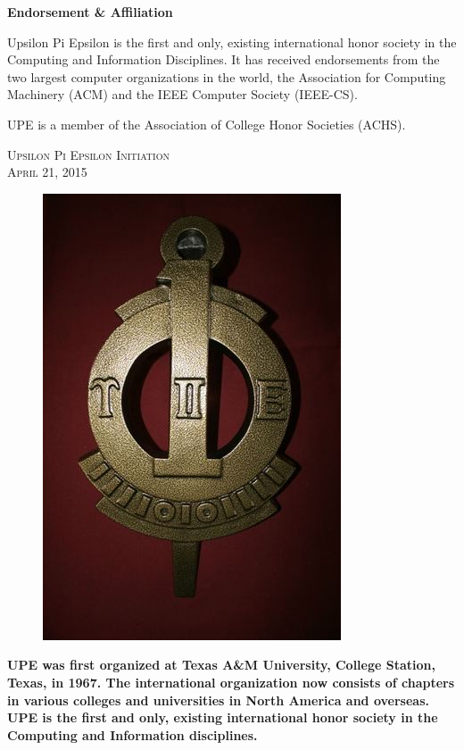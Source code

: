 \documentclass{article}
\begin{document}
\begin{multicols}{2}
{\begin{center}\textbf{Endorsement \& Affiliation}\end{center}

Upsilon Pi Epsilon is the first and only, existing international honor society in the Computing and Information Disciplines. It has received endorsements from the two largest computer organizations in the world, the Association for Computing Machinery (ACM) and the IEEE Computer Society (IEEE-CS).

UPE is a member of the Association of College Honor Societies (ACHS).
}

 \vfill
 \columnbreak
 \hspace{2em}
\begin{center}
\huge{\textsc{Upsilon Pi Epsilon Initiation\\ April 21, 2015}}
\vspace{2 em}
\hspace{2em}
\end{center}
 \begin{figure}
\begin{center}
\includegraphics[scale=0.5]{upekey.jpg}
\end{center}
\end{figure}
\begin{center}
\small{\textbf{
UPE was first organized at Texas A\&M University, College Station, Texas, in 1967. The international organization now consists of chapters in various colleges and universities in North America and overseas. UPE is the first and only, existing international honor society in the Computing and Information disciplines. }
}
\end{center}
 \vspace{3em}
\end{multicols}
\end{document}
